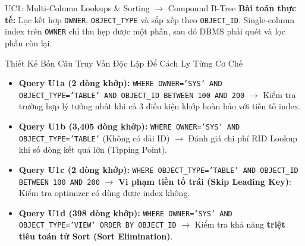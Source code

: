 \documentclass[aspectratio=169,9pt]{beamer}
\begin{document}
\begin{frame}{UC1: Multi-Column Lookups \& Sorting $\to$ Compound B-Tree}
\textbf{Bài toán thực tế:} Lọc kết hợp \texttt{OWNER}, \texttt{OBJECT\_TYPE} và sắp xếp theo \texttt{OBJECT\_ID}. Single-column index trên \texttt{OWNER} chỉ thu hẹp được một phần, sau đó DBMS phải quét và lọc phần còn lại.

\begin{block}{Thiết Kế Bốn Câu Truy Vấn Độc Lập Để Cách Ly Từng Cơ Chế}
\footnotesize
\begin{itemize}
  \item \textbf{Query U1a (2 dòng khớp):} \texttt{WHERE OWNER='SYS' AND OBJECT\_TYPE='TABLE' AND OBJECT\_ID BETWEEN 100 AND 200} $\to$ Kiểm tra trường hợp lý tưởng nhất khi cả 3 điều kiện khớp hoàn hảo với tiền tố index.
  \item \textbf{Query U1b (3,405 dòng khớp):} \texttt{WHERE OWNER='SYS' AND OBJECT\_TYPE='TABLE'} (Không có dải ID) $\to$ Đánh giá chi phí RID Lookup khi số dòng kết quả lớn (Tipping Point).
  \item \textbf{Query U1c (2 dòng khớp):} \texttt{WHERE OBJECT\_TYPE='TABLE' AND OBJECT\_ID BETWEEN 100 AND 200} $\to$ \textbf{Vi phạm tiền tố trái (Skip Leading Key)}: Kiểm tra optimizer có dùng được index không.
  \item \textbf{Query U1d (398 dòng khớp):} \texttt{WHERE OWNER='SYS' AND OBJECT\_TYPE='VIEW' ORDER BY OBJECT\_ID} $\to$ Kiểm tra khả năng \textbf{triệt tiêu toán tử Sort (Sort Elimination)}.
\end{itemize}
\end{block}
\end{frame}
\end{document}
